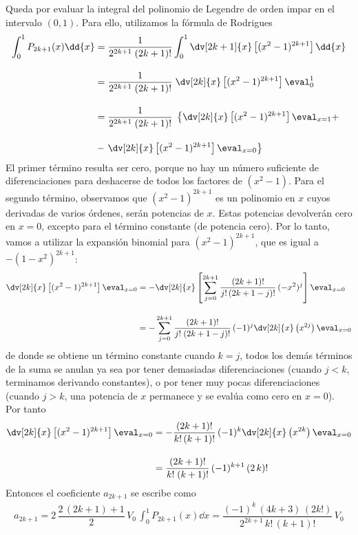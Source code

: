 Queda por evaluar la integral del polinomio de Legendre de orden impar en el intervalo $(0, 1)$. Para ello, utilizamos la fórmula de Rodrigues
\begin{align*}
\int_{0}^{1} P_{2k+1} (x) \dd{x} &= \dfrac{1}{2^{2k+1} \; (2k +1)!} \int_{0}^{1} \dv[2k+1]{x} \left[ (x^{2} - 1)^{2k+1} \right] \dd{x} \\[1em]
&= \dfrac{1}{2^{2k+1} \; (2k +1)!} \; \dv[2k]{x} \left[ (x^{2} - 1)^{2k+1} \right] \eval_{0}^{1} \\[1em]
&= \dfrac{1}{2^{2k+1} \; (2k +1)!} \; \left\{ \dv[2k]{x} \left[ (x^{2} - 1)^{2k+1} \right] \eval_{x=1} + \right. \\[1em]
&- \left. \dv[2k]{x} \left[ (x^{2} - 1)^{2k+1} \right] \eval_{x=0} \right\}
\end{align*}
El primer término resulta ser cero, porque no hay un número suficiente de diferenciaciones para deshacerse de todos los factores de $(x^{2} - 1)$. Para el segundo término, observamos que $(x^{2} - 1)^{2k + 1}$ es un polinomio en $x$ cuyos derivadas de varios órdenes, serán potencias de $x$. Estas potencias devolverán cero en $x = 0$, excepto para el término constante (de potencia cero). Por lo tanto, vamos a utilizar la expansión binomial para $(x^{2} - 1)^{2k + 1}$, que es igual a $-(1 - x^{2})^{2k + 1}$:
\begin{align*}
\dv[2k]{x} \left[ (x^{2} - 1)^{2k+1} \right] \eval_{x=0} &= - \dv[2k]{x} \left[ \sum_{j=0}^{2k+1} \dfrac{(2k+1)!}{j! \, (2k + 1 - j)!} \, (-x^{2})^{j} \right] \eval_{x=0} \\[1em]
&= - \sum_{j=0}^{2k+1} \dfrac{(2k+1)!}{j! \; (2k + 1 - j)!} \, (-1)^{j} \dv[2k]{x} \left( x^{2j} \right) \eval_{x=0}
\end{align*}
de donde se obtiene un término constante cuando $k = j$, todos los demás términos de la suma se anulan ya sea por tener  demasiadas diferenciaciones (cuando $j <k$, terminamos derivando constantes), o por tener muy pocas diferenciaciones (cuando $j> k$, una potencia de $x$ permanece y se evalúa como cero en $x = 0$). Por tanto
\begin{align*}
\dv[2k]{x} \left[ (x^{2} - 1)^{2k+1} \right] \eval_{x=0} &= - \dfrac{(2k+1)!}{k! \, (k+1)!} \, (-1)^{k} \dv[2k]{x} \left( x^{2k} \right) \eval_{x=0} \\[1em]
&= \dfrac{(2k+1)!}{k! \; (k + 1)!} \, (-1)^{k+1} \, (2 \, k)!
\end{align*}
Entonces el coeficiente $a_{2k+1}$ se escribe como
\begin{align*}
a_{2k+1} = 2 \, \dfrac{2 \, (2k+1) + 1}{2} \, V_{0} \, \int_{0}^{1} P_{2k+1} (x) \dd{x} = \dfrac{(-1)^{k} \, (4k+3) \, (2k!)}{2^{2k+1} \, k! \, (k+1)!} \, V_{0}
\end{align*}
